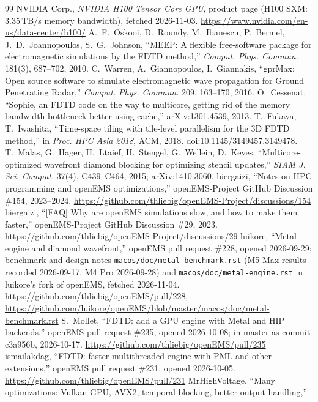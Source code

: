 \documentclass[10pt,a4paper]{article}
\newcommand{\code}[1]{\texttt{\small #1}}
\begin{document}
\begin{thebibliography}{99}
 NVIDIA Corp., \emph{NVIDIA H100 Tensor Core GPU}, product page (H100 SXM: 3.35\,TB/s memory
  bandwidth), fetched 2026-11-03. \url{https://www.nvidia.com/en-us/data-center/h100/}
 A.~F.~Oskooi, D.~Roundy, M.~Ibanescu, P.~Bermel, J.~D.~Joannopoulos, S.~G.~Johnson, ``MEEP: A flexible
  free-software package for electromagnetic simulations by the FDTD method,'' \emph{Comput. Phys. Commun.} 181(3),
  687--702, 2010.
 C.~Warren, A.~Giannopoulos, I.~Giannakis, ``gprMax: Open source software to simulate electromagnetic
  wave propagation for Ground Penetrating Radar,'' \emph{Comput. Phys. Commun.} 209, 163--170, 2016.
 O.~Cessenat, ``Sophie, an FDTD code on the way to multicore, getting rid of the memory bandwidth
  bottleneck better using cache,'' arXiv:1301.4539, 2013.
 T.~Fukaya, T.~Iwashita, ``Time-space tiling with tile-level parallelism for the 3D FDTD method,''
  in \emph{Proc. HPC Asia 2018}, ACM, 2018. doi:10.1145/3149457.3149478.
 T.~Malas, G.~Hager, H.~Ltaief, H.~Stengel, G.~Wellein, D.~Keyes, ``Multicore-optimized wavefront
  diamond blocking for optimizing stencil updates,'' \emph{SIAM J. Sci. Comput.} 37(4), C439--C464, 2015; arXiv:1410.3060.
 biergaizi, ``Notes on HPC programming and openEMS optimizations,'' openEMS-Project GitHub
  Discussion \#154, 2023--2024. \url{https://github.com/thliebig/openEMS-Project/discussions/154}
 biergaizi, ``[FAQ] Why are openEMS simulations slow, and how to make them faster,''
  openEMS-Project GitHub Discussion \#29, 2023. \url{https://github.com/thliebig/openEMS-Project/discussions/29}
 luikore, ``Metal engine and diamond wavefront,'' openEMS pull request \#228, opened 2026-09-29;
  benchmark and design notes \code{macos/doc/metal-benchmark.rst} (M5 Max results recorded 2026-09-17, M4 Pro
  2026-09-28) and \code{macos/doc/metal-engine.rst} in luikore's fork of openEMS, fetched 2026-11-04.
  \url{https://github.com/thliebig/openEMS/pull/228},
  \url{https://github.com/luikore/openEMS/blob/master/macos/doc/metal-benchmark.rst}
 S.~Mollet, ``FDTD: add a GPU engine with Metal and HIP backends,'' openEMS pull request \#235,
  opened 2026-10-08; in master as commit c3a956b, 2026-10-17. \url{https://github.com/thliebig/openEMS/pull/235}
 ismailakdag, ``FDTD: faster multithreaded engine with PML and other extensions,'' openEMS pull
  request \#231, opened 2026-10-05. \url{https://github.com/thliebig/openEMS/pull/231}
 MrHighVoltage, ``Many optimizations: Vulkan GPU, AVX2, temporal blocking, better output-handling,''

\end{thebibliography}
\end{document}
